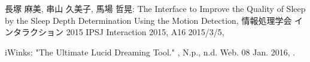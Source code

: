 \begin{bib}[100]
\begin{flushleft}
  長塚 麻美, 串山 久美子, 馬場 哲晃:
  \newblock  The Interface to Improve the Quality of Sleep by the Sleep Depth Determination Using the Motion Detection,
  \newblock 情報処理学会 インタラクション 2015 IPSJ Interaction 2015,
  \newblock  A16 2015/3/5,
\end{flushleft}

\begin{flushleft}
iWinks:
 \newblock  "The Ultimate Lucid Dreaming Tool." ,
  \newblock N.p., n.d. Web. 08 Jan. 2016,
  .
\end{flushleft}

\end{bib}